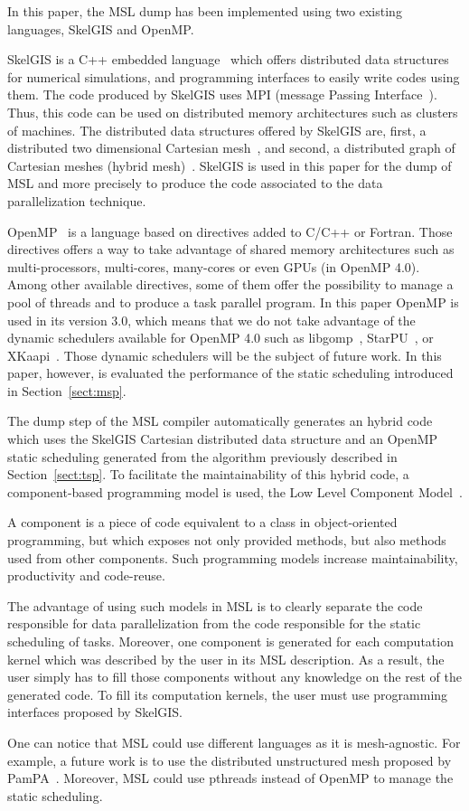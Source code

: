 In this paper, the MSL dump has been implemented using two existing languages, SkelGIS and OpenMP.

SkelGIS is a C++ embedded language~\cite{} which offers distributed data structures for numerical simulations, and programming interfaces to easily write codes using them. The code produced by SkelGIS uses MPI (message Passing Interface~\cite{}). Thus, this code can be used on distributed memory architectures such as clusters of machines. The distributed data structures offered by SkelGIS are, first, a distributed two dimensional Cartesian mesh~\cite{}, and second, a distributed graph of Cartesian meshes (hybrid mesh)~\cite{}. SkelGIS is used in this paper for the dump of MSL and more precisely to produce the code associated to the data parallelization technique.

OpenMP~\cite{} is a language based on directives added to C/C++ or Fortran. Those directives offers a way to take advantage of shared memory architectures such as multi-processors, multi-cores, many-cores or even GPUs (in OpenMP 4.0). Among other available directives, some of them offer the possibility to manage a pool of threads and to produce a task parallel program. In this paper OpenMP is used in its version 3.0, which means that we do not take advantage of the dynamic schedulers available for OpenMP 4.0 such as libgomp~\cite{}, StarPU~\cite{}, or XKaapi~\cite{}. Those dynamic schedulers will be the subject of future work. In this paper, however, is evaluated the performance of the static scheduling introduced in Section~\ref{sect:msp}.

The dump step of the MSL compiler automatically generates an hybrid code which uses the SkelGIS Cartesian distributed data structure and an OpenMP static scheduling generated from the algorithm previously described in Section~\ref{sect:tsp}. To facilitate the maintainability of this hybrid code, a component-based programming model is used, the Low Level Component Model~\cite{}. 

A component is a piece of code equivalent to a class in object-oriented programming, but which exposes not only provided methods, but also methods used from other components. Such programming models increase maintainability, productivity and code-reuse.

The advantage of using such models in MSL is to clearly separate the code responsible for data parallelization from the code responsible for the static scheduling of tasks. Moreover, one component is generated for each computation kernel which was described by the user in its MSL description. As a result, the user simply has to fill those components without any knowledge on the rest of the generated code. To fill its computation kernels, the user must use programming interfaces proposed by SkelGIS.

One can notice that MSL could use different languages as it is mesh-agnostic. For example, a future work is to use the distributed unstructured mesh proposed by PamPA~\cite{}. Moreover, MSL could use pthreads instead of OpenMP to manage the static scheduling.

